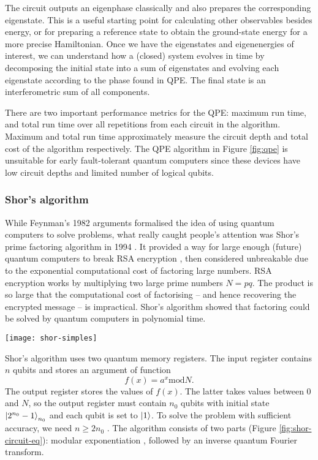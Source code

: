\documentclass[10pt]{iopart}
\begin{document}
The circuit outputs an eigenphase classically and also prepares the corresponding eigenstate. This is a useful starting point for calculating other observables besides energy, or for preparing a reference state to obtain the ground-state energy for a more precise Hamiltonian. Once we have the eigenstates and eigenenergies of interest, we can understand how a (closed) system evolves in time by decomposing the initial state into a sum of eigenstates and evolving each eigenstate according to the phase found in QPE. The final state is an interferometric sum of all components.

There are two important performance metrics for the QPE: maximum run time, and total run time over all repetitions from each circuit in the algorithm. Maximum and total run time approximately measure the circuit depth and total cost of the algorithm respectively. The QPE algorithm in Figure \ref{fig:qpe} is unsuitable for early fault-tolerant quantum computers since these devices have low circuit depths and limited number of logical qubits.


\subsubsection{Shor's algorithm}\hfill

While Feynman's 1982 arguments \cite{Feynman1982} formalised the idea of using quantum computers to solve problems, what really caught people's attention was Shor's prime factoring algorithm in 1994 \cite{Shor1994,Ekert1996}. It provided a way for large enough (future) quantum computers to break RSA encryption \cite{Rivest1978}, then considered unbreakable due to the exponential computational cost of factoring large numbers. RSA encryption works by multiplying two large prime numbers $N=pq$. The product is so large that the computational cost of factorising -- and hence recovering the encrypted message -- is impractical. Shor's algorithm showed that factoring could be solved by quantum computers in polynomial time. 

\begin{figure*}[ht!]
\centering
\texttt{[image: shor-simples]}
\caption{Quantum circuit schematics for Shor's algorithm. \textbf{(a)} Circuit for calculating function $f(x)=a^x(\text{mod} N)$, \textbf{(b)} Shor's algorithm for period finding.}
\label{fig:shor-circuit-eq}
\end{figure*}

Shor's algorithm uses two quantum memory registers. The input register contains $n$ qubits and stores an argument of function 
\begin{equation}\label{eq:shor-f}
f(x)=a^x \text{mod}N. 
\end{equation}
The output register stores the values of $f(x)$. The latter takes values between $0$ and $N$, so the output register must contain $n_0$ qubits with initial state $\ket{2^{n_0}-1}_{n_0}$ and each qubit is set to $\ket{1}$. To solve the problem with sufficient accuracy, we need $n \geq 2n_0$ \cite{Shor1994}. The algorithm consists of two parts (Figure \ref{fig:shor-circuit-eq}): modular exponentiation \cite{Vedral1996,Pavlidis2014}, followed by an inverse quantum Fourier transform.
\end{document}
